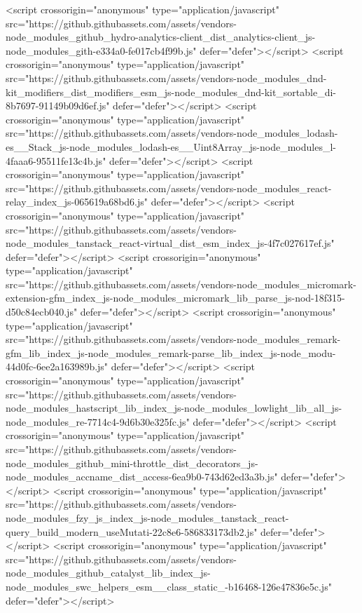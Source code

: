 <script crossorigin="anonymous" type="application/javascript" src="https://github.githubassets.com/assets/vendors-node_modules_github_hydro-analytics-client_dist_analytics-client_js-node_modules_gith-e334a0-fe017cb4f99b.js" defer="defer"></script>
<script crossorigin="anonymous" type="application/javascript" src="https://github.githubassets.com/assets/vendors-node_modules_dnd-kit_modifiers_dist_modifiers_esm_js-node_modules_dnd-kit_sortable_di-8b7697-91149b09d6ef.js" defer="defer"></script>
<script crossorigin="anonymous" type="application/javascript" src="https://github.githubassets.com/assets/vendors-node_modules_lodash-es__Stack_js-node_modules_lodash-es__Uint8Array_js-node_modules_l-4faaa6-95511fe13c4b.js" defer="defer"></script>
<script crossorigin="anonymous" type="application/javascript" src="https://github.githubassets.com/assets/vendors-node_modules_react-relay_index_js-065619a68bd6.js" defer="defer"></script>
<script crossorigin="anonymous" type="application/javascript" src="https://github.githubassets.com/assets/vendors-node_modules_tanstack_react-virtual_dist_esm_index_js-4f7c027617ef.js" defer="defer"></script>
<script crossorigin="anonymous" type="application/javascript" src="https://github.githubassets.com/assets/vendors-node_modules_micromark-extension-gfm_index_js-node_modules_micromark_lib_parse_js-nod-18f315-d50c84ecb040.js" defer="defer"></script>
<script crossorigin="anonymous" type="application/javascript" src="https://github.githubassets.com/assets/vendors-node_modules_remark-gfm_lib_index_js-node_modules_remark-parse_lib_index_js-node_modu-44d0fc-6ee2a163989b.js" defer="defer"></script>
<script crossorigin="anonymous" type="application/javascript" src="https://github.githubassets.com/assets/vendors-node_modules_hastscript_lib_index_js-node_modules_lowlight_lib_all_js-node_modules_re-7714c4-9d6b30e325fc.js" defer="defer"></script>
<script crossorigin="anonymous" type="application/javascript" src="https://github.githubassets.com/assets/vendors-node_modules_github_mini-throttle_dist_decorators_js-node_modules_accname_dist_access-6ea9b0-743d62ed3a3b.js" defer="defer"></script>
<script crossorigin="anonymous" type="application/javascript" src="https://github.githubassets.com/assets/vendors-node_modules_fzy_js_index_js-node_modules_tanstack_react-query_build_modern_useMutati-22c8e6-586833173db2.js" defer="defer"></script>
<script crossorigin="anonymous" type="application/javascript" src="https://github.githubassets.com/assets/vendors-node_modules_github_catalyst_lib_index_js-node_modules_swc_helpers_esm__class_static_-b16468-126e47836e5c.js" defer="defer"></script>

